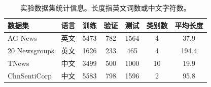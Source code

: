 \begin{table}[htbp]
\centering
\caption{实验数据集统计信息。长度指英文词数或中文字符数。}
\label{tab:datasets}
\small
\begin{tabular}{llccccc}
\toprule
数据集 & 语言 & 训练 & 验证 & 测试 & 类别数 & 平均长度 \\
\midrule
AG News & 英文 & 5473 & 782 & 1564 & 4 & 37.9 \\
20 Newsgroups & 英文 & 1626 & 233 & 465 & 4 & 194.4 \\
TNews & 中文 & 3499 & 500 & 1000 & 10 & 19.9 \\
ChnSentiCorp & 中文 & 5583 & 798 & 1596 & 2 & 95.8 \\
\bottomrule
\end{tabular}
\end{table}
